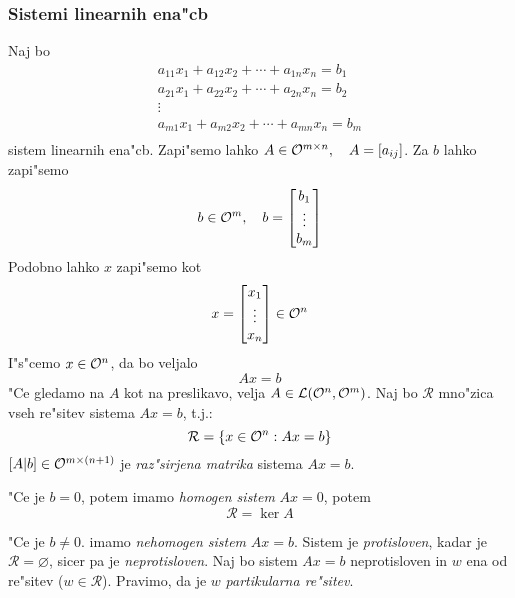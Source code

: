 \subsubsection{Sistemi linearnih ena"cb}
Naj bo
\begin{gather*}
a_{11} x_1 + a_{12} x_2 + \cdots + a_{1n} x_n = b_1 \\
a_{21} x_1 + a_{22} x_2 + \cdots + a_{2n} x_n = b_2 \\
\vdots \\
a_{m1} x_1 + a_{m2} x_2 + \cdots + a_{mn} x_n = b_m \\
\end{gather*}
sistem linearnih ena"cb. Zapi"semo lahko $A \in \mathcal{O}^{m \times n}, \quad A = [a_{ij}]$. Za $b$ lahko zapi"semo
\begin{equation*}
b \in \mathcal{O}^m, \quad b = \begin{bmatrix}
b_1 \\
\vdots \\
b_m
\end{bmatrix}
\end{equation*}
Podobno lahko $x$ zapi"semo kot
\begin{equation*}
x = \begin{bmatrix}
x_1 \\
\vdots \\
x_n
\end{bmatrix} \in \mathcal{O}^n
\end{equation*}
I"s"cemo $x \in \mathcal{O}^n$, da bo veljalo
\begin{equation*}
Ax = b
\end{equation*}
"Ce gledamo na $A$ kot na preslikavo, velja $A \in \mathcal{L}(\mathcal{O}^n, \mathcal{O}^m)$. Naj bo $\mathcal{R}$ mno"zica vseh re"sitev sistema $Ax = b$, t.j.:
\begin{equation*}
\mathcal{R} = \{x \in \mathcal{O}^n: Ax = b\}
\end{equation*}
$[A|b] \in \mathcal{O}^{m \times (n + 1)}$ je \emph{raz"sirjena matrika} sistema $Ax = b$. 

"Ce je $b = 0$, potem imamo \emph{homogen sistem} $Ax = 0$, potem
\begin{equation*}
\mathcal{R} = \ker A
\end{equation*}

"Ce je $b \neq 0$. imamo \emph{nehomogen sistem} $Ax = b$. Sistem je \emph{protisloven}, kadar je $\mathcal{R} = \varnothing$, sicer pa je \emph{neprotisloven}. Naj bo sistem $Ax = b$ neprotisloven in $w$ ena od re"sitev ($w \in \mathcal{R}$). Pravimo, da je $w$ \emph{partikularna re"sitev}.

